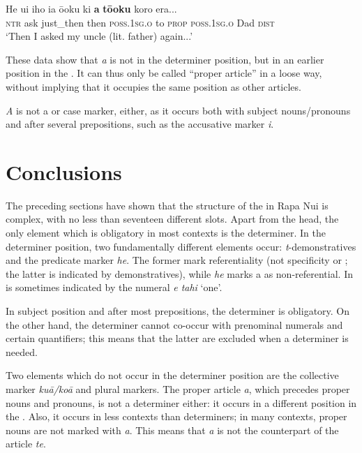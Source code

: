 \ea\label{ex:5.198}
\gll He {\ꞌ}ui iho ia ō{\ꞌ}oku ki \textbf{a} \textbf{tō{\ꞌ}oku} koro era... \\
\textsc{ntr} ask just\_then then \textsc{poss.1sg.o} to \textsc{prop} \textsc{poss.1sg.o} Dad \textsc{dist} \\

\glt
‘Then I asked my uncle (lit. father) again...’ \textstyleExampleref{[R230.121]} 
\z

These data show that \textit{a} is not in the determiner position, but in an earlier position in the . It can thus only be called “proper article” in a loose way, without implying that it occupies the same position as other articles.

\textit{A} is not a  or case marker, either, as it occurs both with subject nouns/pro\-nouns and after several prepositions, such as the accusative marker \textit{i}.
\section{Conclusions}\label{sec:5.14}

The preceding sections have shown that the structure of the  in Rapa Nui is complex, with no less than seventeen different slots. Apart from the head, the only element which is obligatory in most contexts is the determiner. In the determiner position, two fundamentally different elements occur: \textit{t}{}-demonstratives and the predicate marker \textit{he}. The former mark referentiality (not specificity or ; the latter is indicated by demonstratives), while \textit{he} marks a  as non-referential. In is sometimes indicated by the numeral \textit{e tahi} ‘one’.

In subject position and after most prepositions, the determiner is obligatory. On the other hand, the determiner cannot co-occur with prenominal numerals and certain quantifiers; this means that the latter are excluded when a determiner is needed. 

Two elements which do not occur in the determiner position are the collective marker \textit{kuā/koā} and plural markers. The proper article \textit{a}, which precedes proper nouns and pronouns, is not a determiner either: it occurs in a different position in the . Also, it occurs in less contexts than determiners; in many contexts, proper nouns are not marked with \textit{a}. This means that \textit{a} is not the  counterpart of the article \textit{te}.

